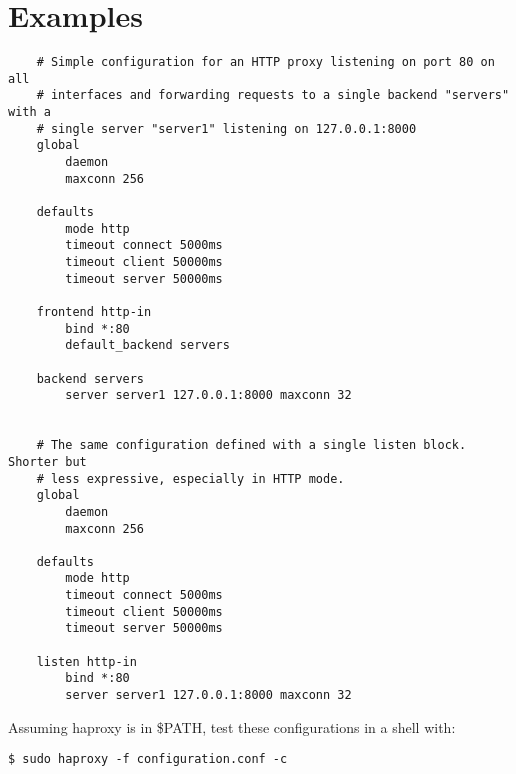 \section{Examples}
\begin{verbatim}
    # Simple configuration for an HTTP proxy listening on port 80 on all
    # interfaces and forwarding requests to a single backend "servers" with a
    # single server "server1" listening on 127.0.0.1:8000
    global
        daemon
        maxconn 256

    defaults
        mode http
        timeout connect 5000ms
        timeout client 50000ms
        timeout server 50000ms

    frontend http-in
        bind *:80
        default_backend servers

    backend servers
        server server1 127.0.0.1:8000 maxconn 32


    # The same configuration defined with a single listen block. Shorter but
    # less expressive, especially in HTTP mode.
    global
        daemon
        maxconn 256

    defaults
        mode http
        timeout connect 5000ms
        timeout client 50000ms
        timeout server 50000ms

    listen http-in
        bind *:80
        server server1 127.0.0.1:8000 maxconn 32
\end{verbatim}

Assuming haproxy is in \$PATH, test these configurations in a shell with:

\verb|$ sudo haproxy -f configuration.conf -c|
